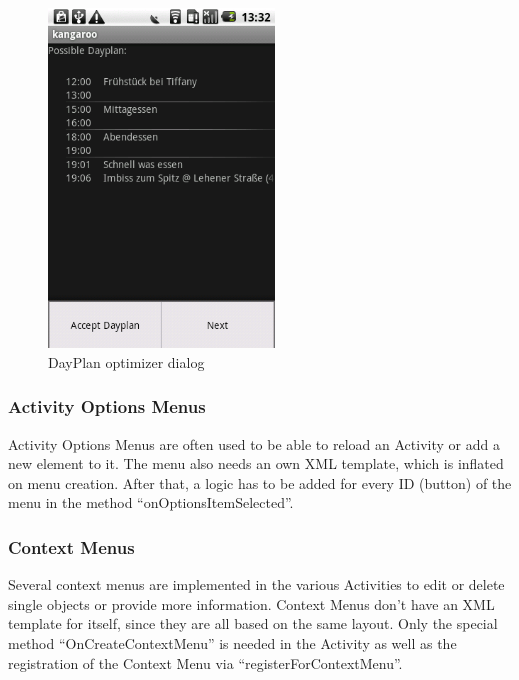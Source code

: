 \begin{figure}[h!]
    \centering
    \includegraphics[width=6cm]{pics/gui/optimize_context.png}
    \caption{DayPlan optimizer dialog}
    \label{img:dayplanoptimize}
\end{figure}


\subsubsection{Activity Options Menus} %
\label{ssub:ActivityMenus}
Activity Options Menus are often used to be able to reload an Activity or add
a new element to it. The menu also needs an own XML template, which is
inflated on menu creation. After that, a logic has to be added for every
ID (button) of the menu in the method ``onOptionsItemSelected''.

\subsubsection{Context Menus} %
\label{ssub:ContextMenus}
Several context menus are implemented in the various Activities to edit or
delete single objects or provide more information. Context Menus don't have
an XML template for itself, since they are all based on the same layout. Only
the special method ``OnCreateContextMenu'' is needed in the Activity as well
as the registration of the Context Menu via ``registerForContextMenu''.


